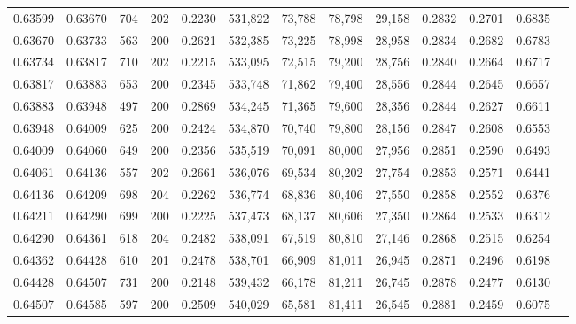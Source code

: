 \begin{tabular}{rrrrrrrrrrrrr}
0.63599 & 0.63670 &   704 & 202 &                                     0.2230 & 531,822 &  73,788 &  78,798 &  29,158 & 0.2832 & 0.2701 & 0.6835 \\
0.63670 & 0.63733 &   563 & 200 &                                     0.2621 & 532,385 &  73,225 &  78,998 &  28,958 & 0.2834 & 0.2682 & 0.6783 \\
0.63734 & 0.63817 &   710 & 202 &                                     0.2215 & 533,095 &  72,515 &  79,200 &  28,756 & 0.2840 & 0.2664 & 0.6717 \\
0.63817 & 0.63883 &   653 & 200 &                                     0.2345 & 533,748 &  71,862 &  79,400 &  28,556 & 0.2844 & 0.2645 & 0.6657 \\
0.63883 & 0.63948 &   497 & 200 &                                     0.2869 & 534,245 &  71,365 &  79,600 &  28,356 & 0.2844 & 0.2627 & 0.6611 \\
0.63948 & 0.64009 &   625 & 200 &                                     0.2424 & 534,870 &  70,740 &  79,800 &  28,156 & 0.2847 & 0.2608 & 0.6553 \\
0.64009 & 0.64060 &   649 & 200 &                                     0.2356 & 535,519 &  70,091 &  80,000 &  27,956 & 0.2851 & 0.2590 & 0.6493 \\
0.64061 & 0.64136 &   557 & 202 &                                     0.2661 & 536,076 &  69,534 &  80,202 &  27,754 & 0.2853 & 0.2571 & 0.6441 \\
0.64136 & 0.64209 &   698 & 204 &                                     0.2262 & 536,774 &  68,836 &  80,406 &  27,550 & 0.2858 & 0.2552 & 0.6376 \\
0.64211 & 0.64290 &   699 & 200 &                                     0.2225 & 537,473 &  68,137 &  80,606 &  27,350 & 0.2864 & 0.2533 & 0.6312 \\
0.64290 & 0.64361 &   618 & 204 &                                     0.2482 & 538,091 &  67,519 &  80,810 &  27,146 & 0.2868 & 0.2515 & 0.6254 \\
0.64362 & 0.64428 &   610 & 201 &                                     0.2478 & 538,701 &  66,909 &  81,011 &  26,945 & 0.2871 & 0.2496 & 0.6198 \\
0.64428 & 0.64507 &   731 & 200 &                                     0.2148 & 539,432 &  66,178 &  81,211 &  26,745 & 0.2878 & 0.2477 & 0.6130 \\
0.64507 & 0.64585 &   597 & 200 &                                     0.2509 & 540,029 &  65,581 &  81,411 &  26,545 & 0.2881 & 0.2459 & 0.6075 \\

\end{tabular}
